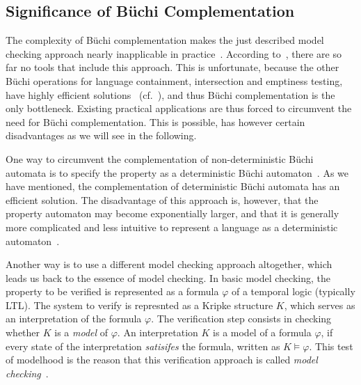 \subsection{Significance of Büchi Complementation}
The complexity of Büchi complementation makes the just described model checking approach nearly inapplicable in practice~\cite{1995_tasiran}. According to~\cite{2007_vardi_model_checking}, there are so far no tools that include this approach. This is unfortunate, because the other Büchi operations for language containment, intersection and emptiness testing, have highly efficient solutions~\cite{2007_vardi_model_checking} (cf.~\cite{1996_vardi}), and thus Büchi complementation is the only bottleneck. Existing practical applications are thus forced to circumvent the need for Büchi complementation. This is possible, has however certain disadvantages as we will see in the following.

One way to circumvent the complementation of non-deterministic Büchi automata is to specify the property as a deterministic Büchi automaton~\cite{1995_tasiran}\cite{2007_vardi_model_checking}. As we have mentioned, the complementation of deterministic Büchi automata has an efficient solution. The disadvantage of this approach is, however, that the property automaton may become exponentially larger, and that it is generally more complicated and less intuitive to represent a language as a deterministic automaton~\cite{1995_tasiran}.

Another way is to use a different model checking approach altogether, which leads us back to the essence of model checking. In basic model checking, the property to be verified is represented as a formula $\varphi$ of a temporal logic (typically LTL). The system to verify is represnted as a Kripke structure $K$, which serves as an interpretation of the formula $\varphi$. The verification step consists in checking whether $K$ is a \textit{model} of $\varphi$. An interpretation $K$ is a model of a formula $\varphi$, if every state of the interpretation \textit{satisifes} the formula, written as $K \models \varphi$. This test of modelhood is the reason that this verification approach is called \textit{model checking}~\cite{1996_vardi}.

